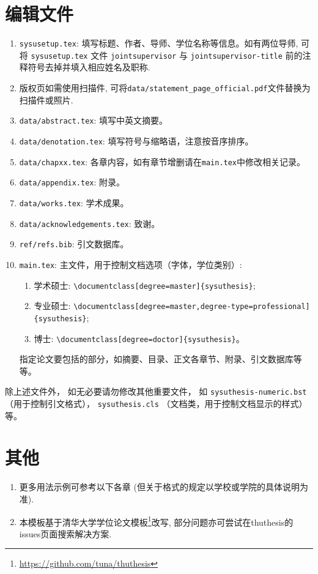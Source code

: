 \section{编辑文件}
\begin{enumerate}
    \item \texttt{sysusetup.tex}: 填写标题、作者、导师、学位名称等信息。如有两位导师, 可将 \verb|sysusetup.tex| 文件 \verb|jointsupervisor| 与 \verb|jointsupervisor-title| 前的注释符号去掉并填入相应姓名及职称.
    \item 版权页如需使用扫描件, 可将\verb|data/statement_page_official.pdf|文件替换为扫描件或照片.
    \item \texttt{data/abstract.tex}: 填写中英文摘要。
    \item \texttt{data/denotation.tex}: 填写符号与缩略语，注意按音序排序。
    \item \texttt{data/chapxx.tex}: 各章内容，如有章节增删请在\texttt{main.tex}中修改相关记录。
    \item \texttt{data/appendix.tex}: 附录。
    \item \texttt{data/works.tex}: 学术成果。
    \item \texttt{data/acknowledgements.tex}: 致谢。
    \item \texttt{ref/refs.bib}: 引文数据库。
    \item \texttt{main.tex}: 主文件，用于控制文档选项（字体，学位类别）:

    \begin{enumerate}
        \item 学术硕士: \verb|\documentclass[degree=master]{sysuthesis}|;
        \item 专业硕士: \verb|\documentclass[degree=master,degree-type=professional]{sysuthesis}|;
        \item 博士: \verb|\documentclass[degree=doctor]{sysuthesis}|。
    \end{enumerate}
    指定论文要包括的部分，如摘要、目录、正文各章节、附录、引文数据库等等。
\end{enumerate}

除上述文件外，
如无必要请勿修改其他重要文件，
如 \verb|sysuthesis-numeric.bst|（用于控制引文格式），
\verb|sysuthesis.cls| （文档类，用于控制文档显示的样式）等。

\section{其他}
\begin{enumerate}
    \item 更多用法示例可参考以下各章 (但关于格式的规定以学校或学院的具体说明为准).
    \item 本模板基于清华大学学位论文模板\footnote{\url{https://github.com/tuna/thuthesis}}改写, 部分问题亦可尝试在thuthesis的issues页面搜索解决方案.
\end{enumerate}

\cleardoublepage
